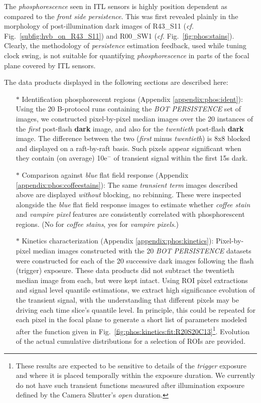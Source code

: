 The {\it phosphorescence} seen in ITL sensors is highly position dependent as compared to the {\it front side persistence}. This was first revealed plainly in the morphology of post-illumination dark images of R43\_S11 ({\it cf.} Fig.~\ref{subfig:hvb_on_R43_S11}) and R00\_SW1 ({\it cf.} Fig.~\ref{fig:phos:stains}). Clearly, the methodology of {\it persistence} estimation feedback, used while tuning clock swing, is not suitable for quantifying {\it phosphorescence} in parts of the focal plane covered by ITL sensors.

The data products displayed in the following sections are described here:
\begin{itemize}
    \item[$\ast$] Identification phosphorescent regions (Appendix \ref{appendix:phos:ident}): Using the 20 B-protocol runs containing the {\it BOT PERSISTENCE} set of images, we constructed pixel-by-pixel median images over the 20 instances of the {\it first} post-flash {\bf dark} image, and also for the {\it twentieth} post-flash {\bf dark} image. The difference between the two ({\it first} minus {\it twentieth}) is 8x8 blocked and displayed on a raft-by-raft basis. Such pixels appear significant when they contain (on average) 10e$^-$ of transient signal within the first 15s dark.
    \item[$\ast$] Comparison against {\it blue} flat field response (Appendix \ref{appendix:phos:coffeestains}): The same {\it transient term} images described above are displayed {\it without} blocking, no rebinning. These were inspected alongside the {\it blue} flat field response images to estimate whether {\it coffee stain} and {\it vampire pixel} features are consistently correlated with phosphorescent regions. (No for {\it coffee stains}, yes for {\it vampire pixels}.)
    \item[$\ast$] Kinetics characterization (Appendix \ref{appendix:phos:kinetics}): Pixel-by-pixel median images constructed with the 20 {\it BOT PERSISTENCE} datasets were constructed for each of the 20 successive dark images following the flash (trigger) exposure. These data products did not subtract the twentieth median image from each, but were kept intact. Using ROI pixel extractions and signal level quantile estimations, we extract high significance evolution of the transient signal, with the understanding that different pixels may be driving each time slice's quantile level. In principle, this could be repeated for each pixel in the focal plane to generate a short list of parameters modeled after the function given in Fig.~\ref{fig:phos:kinetics:fit:R20S20C13}\footnote{These results are expected to be sensitive to details of the {\it trigger} exposure and where it is placed temporally within the exposure duration. We currently do not have such transient functions measured after illumination exposure defined by the Camera Shutter's {\it open} duration.}. Evolution of the actual cumulative distributions for a selection of ROIs are provided.

\end{itemize}
